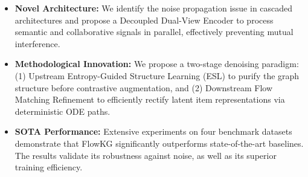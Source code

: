 \begin{itemize}
	\item \textbf{Novel Architecture:} We identify the noise propagation issue in cascaded architectures and propose a Decoupled Dual-View Encoder to process semantic and collaborative signals in parallel, effectively preventing mutual interference.
	\item \textbf{Methodological Innovation:} We propose a two-stage denoising paradigm: (1) Upstream Entropy-Guided Structure Learning (ESL) to purify the graph structure before contrastive augmentation, and (2) Downstream Flow Matching Refinement to efficiently rectify latent item representations via deterministic ODE paths.
	\item \textbf{SOTA Performance:} Extensive experiments on four benchmark datasets demonstrate that FlowKG significantly outperforms state-of-the-art baselines. The results validate its robustness against noise, as well as its superior training efficiency.
\end{itemize}


